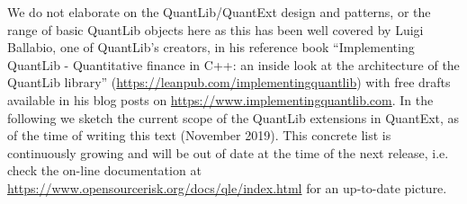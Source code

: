 \documentclass[12pt, a4paper]{article}
\begin{document}
We do not elaborate on the QuantLib/QuantExt design and patterns, or the range of basic QuantLib objects here as this has been well covered by Luigi Ballabio, one of QuantLib's creators, in his reference book ``Implementing QuantLib - Quantitative finance in C++: an inside look at the architecture of the QuantLib library''
(\url{https://leanpub.com/implementingquantlib}) with free drafts available in his blog posts on \url{https://www.implementingquantlib.com}.
In the following we sketch the current scope of the QuantLib extensions in QuantExt, as of the time of writing this text (November 2019). 
This concrete list is continuously growing and will be out of date at the time of the next release, i.e. check the on-line documentation at \url{https://www.opensourcerisk.org/docs/qle/index.html} for an up-to-date picture.
\end{document}
